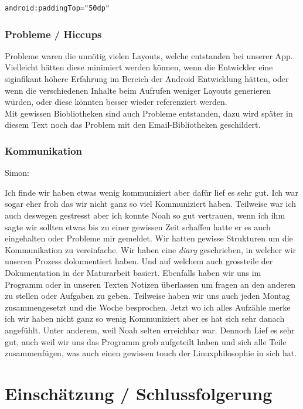 \documentclass[a4paper,11pt]{article}
\begin{document}
\lstset{language=XML}
\begin{lstlisting}
android:paddingTop="50dp"
\end{lstlisting}

\subsubsection{Probleme / Hiccups}
Probleme waren die unnötig vielen Layouts, welche entstanden bei unserer App. Vielleicht hätten diese minimiert werden können, wenn die Entwickler eine siginfikant höhere Erfahrung im Bereich der Android Entwicklung hätten, oder wenn die verschiedenen Inhalte beim Aufrufen weniger Layouts generieren würden, oder diese könnten besser wieder referenziert werden.\\

Mit gewissen Biobliotheken sind auch Probleme entstanden, dazu wird später in diesem Text noch das Problem mit den Email-Bibliotheken geschildert.

\subsubsection{Kommunikation}

Simon:

Ich finde wir haben etwas wenig kommuniziert aber dafür lief es sehr gut. Ich war sogar eher froh das wir nicht ganz so viel 
Kommuniziert haben. Teilweise war ich auch deswegen gestresst aber ich konnte Noah so gut vertrauen, wenn ich ihm sagte wir sollten etwas bis zu einer gewissen Zeit schaffen
hatte er es auch eingehalten oder Probleme mir gemeldet. Wir hatten gewisse Strukturen um die Kommunikation zu vereinfache. Wir haben 
eine \textit{diary} geschrieben, in welcher wir unseren Prozess dokumentiert haben. Und auf welchem auch grossteile der Dokumentation in der Maturarbeit basiert. 
Ebenfalls haben wir uns im Programm oder in unseren Texten Notizen überlassen um fragen an den anderen zu stellen oder Aufgaben zu geben. Teilweise haben wir uns auch jeden Montag zusammengesetzt
und die Woche besprochen. Jetzt wo ich alles Aufzähle merke ich wir haben nicht ganz so wenig Kommuniziert aber es hat sich sehr danach angefühlt. Unter anderem, weil Noah selten erreichbar
war. Dennoch Lief es sehr gut, auch weil wir uns das Programm grob aufgeteilt haben und sich alle Teile zusammenfügen, was auch einen gewissen touch der Linuxphilosophie in sich hat. 

\section{Einschätzung / Schlussfolgerung}
\end{document}
